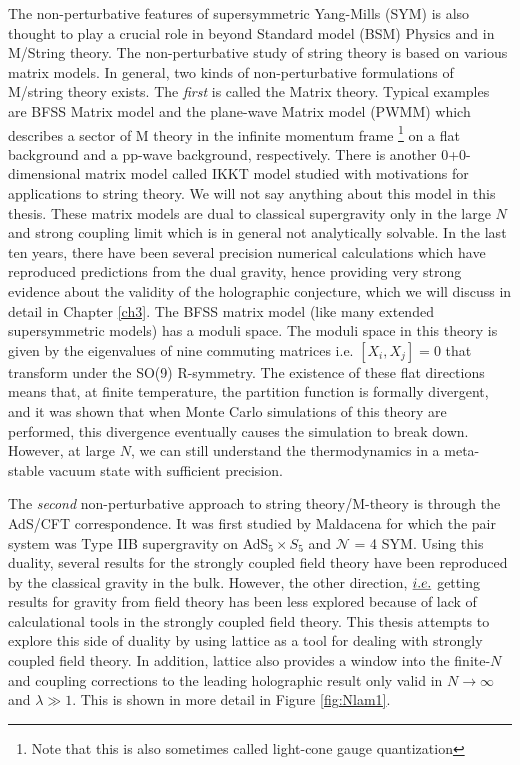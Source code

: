 The non-perturbative features of supersymmetric Yang-Mills (SYM) is also 
thought to play a crucial role in beyond 
Standard model (BSM) Physics and in M/String theory. 
The non-perturbative study of string theory is based on various matrix models. 
In general, two kinds of non-perturbative formulations of M/string theory exists. 
The \textit{first} is called the Matrix theory. Typical examples are BFSS Matrix model and the
plane-wave Matrix model (PWMM) which describes a sector
of M theory in the infinite momentum frame \footnote{Note that this is
also sometimes called light-cone gauge quantization} on a flat
background and a pp-wave background, respectively. There is another 
0+0-dimensional matrix model called IKKT model \cite{Ishibashi:1996xs}
studied with motivations for applications to string theory. We will not say anything about this 
model in this thesis. These matrix models are dual to classical supergravity only in the large $N$ 
and strong coupling limit which is in general not analytically solvable. In the last ten years, there have 
been several precision numerical calculations which have reproduced predictions from the dual gravity, 
hence providing very strong evidence about the validity of the holographic conjecture, 
which we will discuss in detail in Chapter \ref{ch3}. The BFSS matrix model 
(like many extended supersymmetric models) has a moduli space. 
The moduli space in this theory is given by the eigenvalues of nine commuting matrices i.e. 
$ [X_{i}, X_{j}] = 0 $ that transform under the SO(9) R-symmetry. 
The existence of these flat directions means that, at finite temperature,
the partition function is formally divergent, and it was shown that when Monte
Carlo simulations of this theory are performed, this divergence eventually causes the
simulation to break down. However, at large $N$, we can still understand the
thermodynamics in a meta-stable vacuum state with sufficient precision. 

The \textit{second} non-perturbative approach to string theory/M-theory 
is through the AdS/CFT correspondence. It was first studied by Maldacena for which the pair system was 
Type IIB supergravity on AdS$_5 \times S_5$ and $\mathcal{N}$ = 4 SYM.
Using this duality, several results for the strongly coupled field theory have been reproduced by the classical 
gravity in the bulk. However, the other direction, $\emph{i.e.}$
getting results for gravity from field theory has been less explored because of lack of calculational tools in 
the strongly coupled field theory. This thesis attempts to explore this side of duality by using lattice as a tool for 
dealing with strongly coupled field theory. 
In addition, lattice also provides a window into the finite-$N$ and coupling corrections to the leading holographic 
result only valid in $N \to \infty$ and $\lambda \gg 1$. This is shown in more detail in Figure \ref{fig:Nlam1}. 


